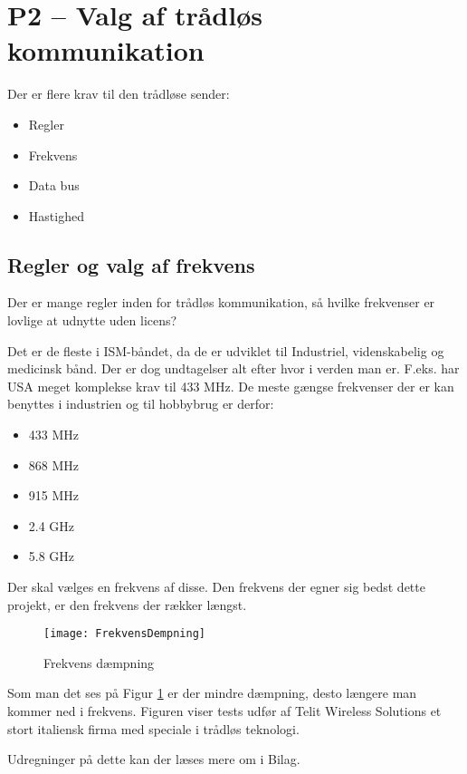 \documentclass[Main]{subfiles}
\begin{document}
\section[Valg af trådløs kommunikation]{P2 -- Valg af trådløs kommunikation}

Der er flere krav til den trådløse sender:
\begin{itemize}
\item Regler
\item Frekvens
\item Data bus
\item Hastighed
\end{itemize}

\subsection{Regler og valg af frekvens}
Der er mange regler inden for trådløs kommunikation, så hvilke frekvenser er lovlige at udnytte uden licens?

Det er de fleste i ISM-båndet, da de er udviklet til  Industriel, videnskabelig og medicinsk bånd. 
Der er dog undtagelser alt efter hvor i verden man er.
F.eks. har USA meget komplekse krav til 433 MHz\cite[s. 32]{Lov1}.
De meste gængse frekvenser der er kan benyttes i industrien og til hobbybrug er derfor:

\begin{itemize}
\item 433 MHz
\item 868 MHz
\item 915 MHz
\item 2.4 GHz
\item 5.8 GHz
\end{itemize}

Der skal vælges en frekvens af disse.
Den frekvens der egner sig bedst dette projekt, er den frekvens der rækker længst. 

\begin{figure}[H]
\centering
\texttt{[image: FrekvensDempning]}
\caption{Frekvens dæmpning}
\label{Fig:dempning}
\end{figure}


Som man det ses på Figur \ref{Fig:dempning} er der mindre dæmpning, desto længere man kommer ned i frekvens. Figuren viser tests udfør af Telit Wireless Solutions\cite[s. 43]{Telit} et stort italiensk firma med speciale i trådløs teknologi.

Udregninger på dette kan der læses mere om i Bilag\cite{wireless}.
\end{document}
